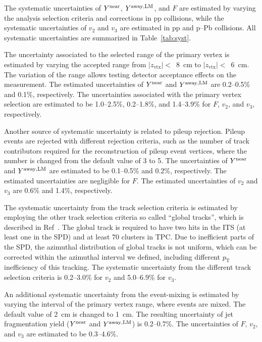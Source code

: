 The systematic uncertainties of $Y^{\rm{near}}$, $Y^{\rm{away,LM}}$, and $F$ are estimated by varying the analysis selection criteria and corrections in pp collisions, while the systematic uncertainties of $v_{2}$ and $v_{3}$ are estimated in pp and p--Pb collisions. All systematic uncertainties are summarized in Table~\ref{tab:syst}.

The uncertainty associated to the selected range of the primary vertex is estimated by varying the accepted range from $|z_\mathrm{vtx}|<$~8~cm to $|z_\mathrm{vtx}|<$~6~cm. The variation of the range allows testing detector acceptance effects on the measurement. The estimated uncertainties of $Y^{\rm{near}}$ and $Y^{\rm{away,LM}}$ are 0.2--0.5\% and 0.1\%, respectively. The uncertainties associated with the primary vertex selection are estimated to be 1.0--2.5\%, 0.2--1.8\%, and 1.4--3.9\% for $F$, $v_{2}$, and $v_{3}$, respectively. 

Another source of systematic uncertainty is related to pileup rejection. Pileup events are rejected with different rejection criteria, such as the number of track contributors required for the reconstruction of pileup event vertices, where the number is changed from the default value of 3 to 5. The uncertainties of $Y^{\rm{near}}$ and $Y^{\rm{away,LM}}$ are estimated to be 0.1--0.5\% and 0.2\%, respectively. The estimated uncertainties are negligible for $F$. The estimated uncertainties of $v_{2}$ and $v_{3}$ are 0.6\% and 1.4\%, respectively.

The systematic uncertainty from the track selection criteria is estimated by employing the other track selection criteria so called “global tracks”, which is described in Ref~\cite{ALICE:2021ptz}. The global track is required to have two hits in the ITS (at least one in the SPD) and at least 70 clusters in TPC. Due to inefficient parts of the SPD, the azimuthal distribution of global tracks is not uniform, which can be corrected within the azimuthal interval we defined, including different $p_{\mathrm{T}}$ inefficiency of this tracking. The systematic uncertainty from the different track selection criteria is  0.2--3.0\% for $v_{2}$ and  5.0--6.9\% for $v_{3}$. 


An additional systematic uncertainty from the event-mixing is estimated by varying the interval of the primary vertex range, where events are mixed. The default value of 2~cm is changed to 1~cm. The resulting uncertainty of jet fragmentation yield ($Y^{\rm{near}}$ and $Y^{\rm{away,LM}}$) is 0.2--0.7\%. The uncertainties of $F$, $v_{2}$, and $v_{3}$ are estimated to be 0.3--4.6\%.

